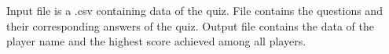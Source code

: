 Input file is a .csv containing data of the quiz. File contains the questions and their corresponding answers of the quiz. Output file contains the data of the player name and the highest score achieved among all players. ~\newline
 